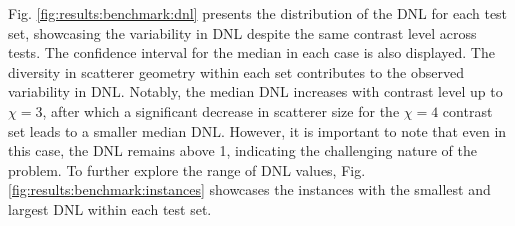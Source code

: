 			
			Fig. \ref{fig:results:benchmark:dnl} presents the distribution of the DNL for each test set, showcasing the variability in DNL despite the same contrast level across tests. The confidence interval for the median in each case is also displayed. The diversity in scatterer geometry within each set contributes to the observed variability in DNL. Notably, the median DNL increases with contrast level up to $\chi=3$, after which a significant decrease in scatterer size for the $\chi=4$ contrast set leads to a smaller median DNL. However, it is important to note that even in this case, the DNL remains above 1, indicating the challenging nature of the problem. To further explore the range of DNL values, Fig. \ref{fig:results:benchmark:instances} showcases the instances with the smallest and largest DNL within each test set.
			
